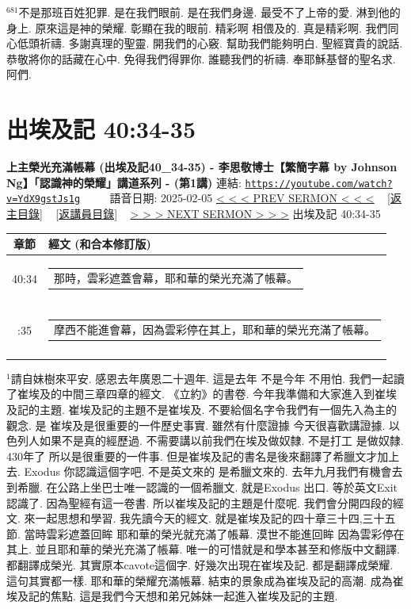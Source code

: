 \documentclass{book}
\begin{document}
$^{681}$不是那班百姓犯罪.
是在我們眼前.
是在我們身邊.
最受不了上帝的愛.
淋到他的身上.
原來這是神的榮耀.
彰顯在我的眼前.
精彩啊 相偎及的.
真是精彩啊.
我們同心低頭祈禱.
多謝真理的聖靈.
開我們的心竅.
幫助我們能夠明白.
聖經寶貴的說話.
恭敬將你的話藏在心中.
免得我們得罪你.
誰聽我們的祈禱.
奉耶穌基督的聖名求.
阿們.
\newpage



\section{出埃及記 40:34-35}
\label{sec:YdX9gstJs1g}
\textbf{上主榮光充滿帳幕 (出埃及記40\_34-35) - 李思敬博士【繁簡字幕 by Johnson Ng】「認識神的榮耀」講道系列 - (第1講)}
\newline
\newline
連結: \href{https://youtube.com/watch?v=YdX9gstJs1g}{\texttt{https://youtube.com/watch?v=YdX9gstJs1g}} ~~~~ 語音日期: 2025-02-05
\newline
\newline
\hyperref[sec:sg1ydBAtBWw]{< < < PREV SERMON < < <}
~
\hyperlink{toc}{[返主目錄]}
~
\hyperref[ch:preacher5]{[返講員目錄]}
~
\hyperref[sec:AXMhGkS0eVE]{> > > NEXT SERMON > > >}
\newline
\newline
出埃及記 40:34-35
\newline
\begin{longtable}{cl}
\hline
\hline
章節 & 經文 (和合本修訂版)\\
\hline
40:34 & \begin{tabularx}{0.7\textwidth}{X} 那時，雲彩遮蓋會幕，耶和華的榮光充滿了帳幕。 \end{tabularx} \\ \\ \relax
40:35 & \begin{tabularx}{0.7\textwidth}{X} 摩西不能進會幕，因為雲彩停在其上，耶和華的榮光充滿了帳幕。 \end{tabularx} \\ \\
[1ex]
\hline
\hline
\end{longtable}
$^{1}$請自妹樹來平安.
感恩去年廣恩二十週年.
這是去年 不是今年 不用怕.
我們一起讀了崔埃及的中間三章四章的經文.
《立約》的書卷.
今年我準備和大家進入到崔埃及記的主題.
崔埃及記的主題不是崔埃及.
不要給個名字令我們有一個先入為主的觀念.
是 崔埃及是很重要的一件歷史事實.
雖然有什麼證據 今天很喜歡講證據.
以色列人如果不是真的經歷過.
不需要講以前我們在埃及做奴隸.
不是打工 是做奴隸.
430年了 所以是很重要的一件事.
但是崔埃及記的書名是後來翻譯了希臘文才加上去.
Exodus 你認識這個字吧.
不是英文來的 是希臘文來的.
去年九月我們有機會去到希臘.
在公路上坐巴士唯一認識的一個希臘文.
就是Exodus 出口.
等於英文Exit 認識了.
因為聖經有這一卷書.
所以崔埃及記的主題是什麼呢.
我們會分開四段的經文.
來一起思想和學習.
我先讀今天的經文.
就是崔埃及記的四十章三十四,三十五節.
當時雲彩遮蓋回眸 耶和華的榮光就充滿了帳幕.
漠世不能進回眸 因為雲彩停在其上.
並且耶和華的榮光充滿了帳幕.
唯一的可惜就是和學本甚至和修版中文翻譯.
都翻譯成榮光.
其實原本cavote這個字.
好幾次出現在崔埃及記.
都是翻譯成榮耀.
這句其實都一樣.
耶和華的榮耀充滿帳幕.
結束的景象成為崔埃及記的高潮.
成為崔埃及記的焦點.
這是我們今天想和弟兄姊妹一起進入崔埃及記的主題.
\end{document}
